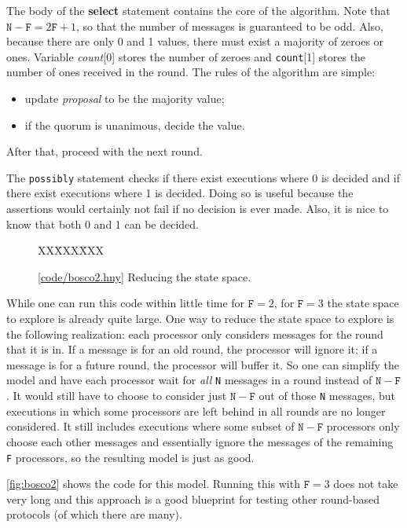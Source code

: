 \documentclass{report}
\newcommand{\harmonysource}[1]{
\begin{tabbing}
XX\=XXX\=XXX\kill
    
\end{tabbing}
}
\newcommand{\harmonylink}[1]{%
[\href{https://harmony.cs.cornell.edu/#1}{\underline{#1}}]%
}
\newenvironment{code}{
\tcolorbox
}{
\endtcolorbox
}
\begin{document}
The body of the \textbf{select} statement contains the core of the algorithm.
Note that $\texttt{N} - \texttt{F} = 2\texttt{F} + 1$, so that the number of
messages is guaranteed to be odd.  Also, because there are only 0 and 1 values, there
must exist a majority of zeroes or ones.  Variable \textit{count}[0] stores the number
of zeroes and \texttt{count}[1] stores the number of ones received in the round.
The rules of the algorithm are simple:
\begin{itemize}
\item update \textit{proposal} to be the majority value;
\item if the quorum is unanimous, decide the value.
\end{itemize}
After that, proceed with the next round.

The \texttt{possibly} statement checks if there exist executions where 0 is
decided and if there exist executions where 1 is decided.  Doing so is useful
because the assertions would certainly not fail if no decision is ever made.
Also, it is nice to know that both 0 and 1 can be decided.

\begin{figure}
\begin{code}
\harmonysource{bosco2}
\end{code}
\caption{\harmonylink{code/bosco2.hny} Reducing the state space.}
\label{fig:bosco2}
\end{figure}

While one can run this code within little time for $\mathtt{F} = 2$, for
$\mathtt{F} = 3$ the state space to explore is already quite large.
One way to reduce the state space to explore is the following realization:
each processor only considers messages for the round that it is in.
If a message is for an old round, the processor will ignore it;
if a message is for a future round, the processor will buffer it.
So one can simplify the model and have each processor wait
for \emph{all} \texttt{N} messages in a round
instead of $\mathtt{N} - \mathtt{F}$.
It would still have to choose to consider just $\mathtt{N} - \mathtt{F}$
out of those \texttt{N} messages, but executions in which some processors
are left behind in all rounds are no longer considered.
It still includes executions where some subset of $\mathtt{N} - \mathtt{F}$
processors only choose each other messages and essentially ignore the
messages of the remaining \texttt{F} processors, so the resulting model
is just as good.

\autoref{fig:bosco2} shows the code for this model.  Running this with
$\mathtt{F} = 3$ does not take very long and this approach is a good
blueprint for testing other round-based protocols (of which there are
many).
\end{document}
